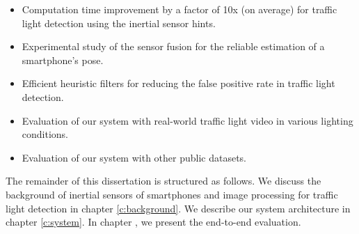 \begin{itemize}
\item Computation time improvement by a factor of 10x (on average) for traffic light detection using the inertial sensor hints. 
\item Experimental study of the sensor fusion for the reliable estimation of a smartphone's pose. 
\item Efficient heuristic filters for reducing the false positive rate in traffic light detection.
\item Evaluation of our system with real-world traffic light video in various lighting conditions. 
\item Evaluation of our system with other public datasets.
  

\end{itemize}

The remainder of this dissertation is structured as follows.
We discuss the background of inertial sensors of smartphones and image processing for traffic light detection in chapter \ref{c:background}.
We describe our system architecture in chapter \ref{c:system}.
In chapter , we present the end-to-end evaluation.
